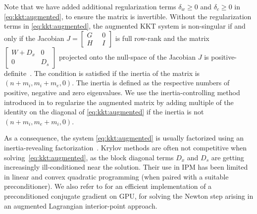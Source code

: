 Note that we have added additional regularization terms $\delta_w \geq 0 $
and $\delta_c \geq 0$ in \eqref{eq:kkt:augmented}, to ensure the
matrix is invertible.
Without the regularization terms in \eqref{eq:kkt:augmented}, the augmented KKT system is non-singular
if and only if the Jacobian $J = \begin{bmatrix} G \; &\; 0 \\ H \;&\; I \end{bmatrix}$
is full row-rank and the matrix $\begin{bmatrix} W + D_x & 0 \\ 0 & D_s \end{bmatrix}$
projected onto the null-space of the Jacobian $J$ is positive-definite~\cite{benzi2005numerical}.
The condition is satisfied if the inertia of the matrix is $(n + m_i, m_i + m_e, 0)$.
The inertia is defined as the respective numbers of positive, negative and zero eigenvalues.
We use the inertia-controlling method introduced in \cite{wachter2006implementation}
to regularize the augmented matrix by adding multiple of the identity
on the diagonal of \eqref{eq:kkt:augmented} if the inertia is not $(n+m_i, m_e+m_i, 0)$.

As a consequence, the system \eqref{eq:kkt:augmented} is usually factorized using
an inertia-revealing \lblt factorization~\cite{duff1983multifrontal}.
Krylov methods are often not competitive when solving~\eqref{eq:kkt:augmented},
as the block diagonal terms $D_x$ and $D_s$ are getting increasingly
ill-conditioned near the solution. Their use in IPM has been limited in
linear and convex quadratic programming \cite{gondzio-2012} (when paired
with a suitable preconditioner). We also refer to \cite{cao-seth-laird-2016}
for an efficient implementation of a preconditioned conjugate gradient
on GPU, for solving the Newton step arising in an augmented Lagrangian interior-point
approach.

